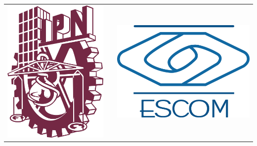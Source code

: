 \documentclass{report}
\begin{document}
\begin{center}
    
    \begin{tabular}{l c r}
    \includegraphics[scale=0.15]{Imagenes/IPN.jpeg}
    & 
        \bf\fontsize{22}{0}{\selectfont{Instituto Polit\'ecnico Nacional}}

    
    & \includegraphics[scale=0.08]{Imagenes/escom.png} \\
     

\end{tabular}
\end{center}
\end{document}
